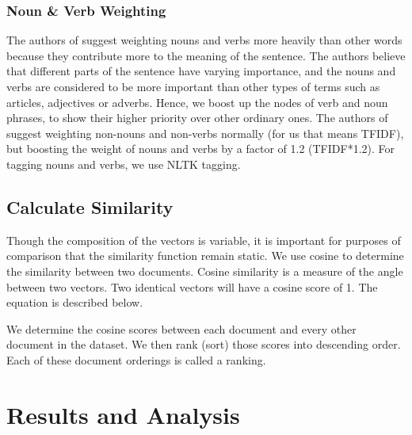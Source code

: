 \documentclass{acm_proc_article-sp}
\begin{document}
\subsubsection{Noun \& Verb Weighting}
The authors of \cite{wang2009syntactic} suggest weighting nouns and verbs more heavily than other words because they contribute more to the meaning of the sentence. The authors believe that different parts of the sentence have varying importance, and the nouns and verbs are considered to be more important than other types of terms such as articles, adjectives or adverbs. Hence, we boost up the nodes of verb and noun phrases, to show their higher priority over other ordinary ones. The authors of \cite{wang2009syntactic} suggest weighting non-nouns and non-verbs normally (for us that means TFIDF), but boosting the weight of nouns and verbs by a factor of 1.2 (TFIDF*1.2). For tagging nouns and verbs, we use NLTK tagging.

\subsection{Calculate Similarity}
Though the composition of the vectors is variable, it is important for purposes of comparison that the similarity function remain static. We use cosine to determine the similarity between two documents. Cosine similarity is a measure of the angle between two vectors. Two identical vectors will have a cosine score of 1. The equation is described below.

We determine the cosine scores between each document and every other document in the dataset. We then rank (sort) those scores into descending order. Each of these document orderings is called a ranking. 

\section{Results and Analysis}
\end{document}
